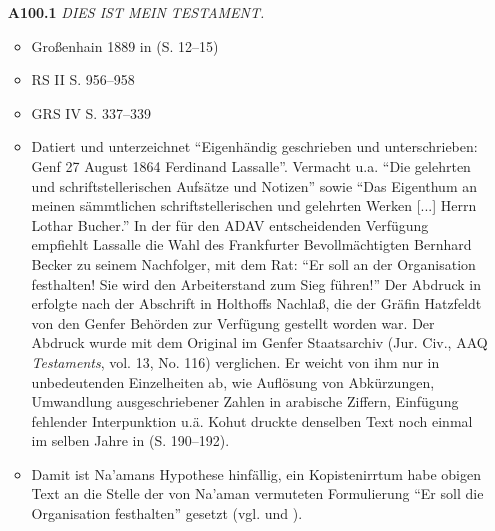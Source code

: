 \begin{itemize}
    \item[\textbf{A100.1}] \textit{DIES IST MEIN TESTAMENT.}
    \begin{itemize}
        \item Großenhain 1889 in  (S. 12--15)
        \item RS II S. 956--958
        \item GRS IV S. 337--339
        \item Datiert und unterzeichnet ``Eigenhändig geschrieben und unterschrieben: Genf 27 August 1864 Ferdinand Lassalle''. Vermacht u.a. ``Die gelehrten und schriftstellerischen Aufsätze und Notizen'' sowie ``Das Eigenthum an meinen sämmtlichen schriftstellerischen und gelehrten Werken [...] Herrn Lothar Bucher.'' In der für den ADAV entscheidenden Verfügung empfiehlt Lassalle die Wahl des Frankfurter Bevollmächtigten Bernhard Becker zu seinem Nachfolger, mit dem Rat: ``Er soll an der Organisation festhalten! Sie wird den Arbeiterstand zum Sieg führen!'' Der Abdruck in  erfolgte nach der Abschrift in Holthoffs Nachlaß, die der Gräfin Hatzfeldt von den Genfer Behörden zur Verfügung gestellt worden war. Der Abdruck wurde mit dem Original im Genfer Staatsarchiv (Jur. Civ., AAQ \textit{Testaments}, vol. 13, No. 116) verglichen. Er weicht von ihm nur in unbedeutenden Einzelheiten ab, wie Auflösung von Abkürzungen, Umwandlung ausgeschriebener Zahlen in arabische Ziffern, Einfügung fehlender Interpunktion u.ä. Kohut druckte denselben Text noch einmal im selben Jahre in  (S. 190--192).
        \item Damit ist Na'amans Hypothese hinfällig, ein Kopistenirrtum habe obigen Text an die Stelle der von Na'aman vermuteten Formulierung ``Er soll die Organisation festhalten'' gesetzt (vgl.  und ).
    \end{itemize}
\end{itemize}

